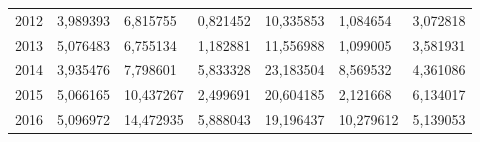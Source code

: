 \begin{table}
\begin{tabular}{p{1cm}p{2cm}p{2cm}p{2cm}p{2cm}p{2cm}p{2cm}}
 2012 &          3,989393 &                                    6,815755 &          0,821452 & 10,335853 &                          1,084654 & 3,072818 \\
 2013 &          5,076483 &                                    6,755134 &          1,182881 & 11,556988 &                          1,099005 & 3,581931 \\
 2014 &          3,935476 &                                    7,798601 &          5,833328 & 23,183504 &                          8,569532 & 4,361086 \\
 2015 &          5,066165 &                                   10,437267 &          2,499691 & 20,604185 &                          2,121668 & 6,134017 \\
 2016 &          5,096972 &                                   14,472935 &          5,888043 & 19,196437 &                         10,279612 & 5,139053 \\
\bottomrule
\end{tabular}
\end{table}
